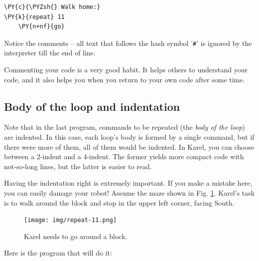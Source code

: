 \noindent
\begin{bbox}
\begin{Verbatim}[commandchars=\\\{\}]
\PY{c}{\PYZsh{} Walk home:}
\PY{k}{repeat} 11
    \PY{n+nf}{go}
\end{Verbatim}
\end{bbox}
\vspace{6mm}

\noindent
Notice the comments -- all text that follows the hash symbol '{\tt \#}' 
is ignored by the interpreter till the end of line. \\

\begin{gbox}
\begin{center}
Commenting your code is a very good habit. It helps others to understand 
your code, and it also helps you when you return to your own code after some time.
\end{center}
\end{gbox}

\subsection{Body of the loop and indentation}

Note that in the last program, commands to be repeated (the {\em body of the loop}) 
are indented. In this case, each loop's body is formed by a single command, but if
there were more of them, all of them would be indented. In Karel, you can choose between 
a 2-indent and a 4-indent. The former yields more compact code with not-so-long lines, 
but the latter is easier to read. 

Having the indentation right is extremely important. If you make 
a mistake here, you can easily damage your robot! 
Assume the maze shown in Fig. \ref{fig:repeat-11}.
Karel's task is to walk around the block and stop in the 
upper left corner, facing South. 

\begin{figure}[!ht]
\begin{center}
\texttt{[image: img/repeat-11.png]}
\vspace{-0mm}
\caption{Karel needs to go around a block.}
\label{fig:repeat-11}
\end{center}
\end{figure}
\noindent
Here is the program that will do it:\\

